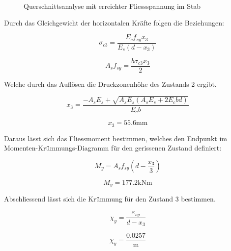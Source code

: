 \documentclass[
  12pt,
  letterpaper,
  egregdoesnotlikesansseriftitles]{scrreprt}
\begin{document}
\begin{figure}[H]


\caption{\label{fig-qs4}Querschnittsanalyse mit erreichter
Fliessspannung im Stab}

\end{figure}%

Durch das Gleichgewicht der horizontalen Kräfte folgen die Beziehungen:

\begin{equation}\sigma_{c 3} = \frac{E_{c} f_{sy} x_{3}}{E_{s} \left(d - x_{3}\right)}\end{equation}

\begin{equation}A_{s} f_{sy} = \frac{b \sigma_{c 3} x_{3}}{2}\end{equation}

Welche durch das Auflösen die Druckzonenhöhe des Zustands 2 ergibt.

\begin{equation}x_{3} = \frac{- A_{s} E_{s} + \sqrt{A_{s} E_{s} \left(A_{s} E_{s} + 2 E_{c} b d\right)}}{E_{c} b}\end{equation}

\begin{equation}x_{3} = 55.6 \text{mm}\end{equation}

Daraus lässt sich das Fliessmoment bestimmen, welches den Endpunkt im
Momenten-Krümmungs-Diagramm für den gerissenen Zustand definiert:

\begin{equation}M_{y} = A_{s} f_{sy} \left(d - \frac{x_{3}}{3}\right)\end{equation}

\begin{equation}M_{y} = 177.2 \text{kN} \text{m}\end{equation}

Abschliessend lässt sich die Krümmung für den Zustand 3 bestimmen.

\begin{equation}\chi_{y} = \frac{\varepsilon_{sy}}{d - x_{3}}\end{equation}

\begin{equation}\chi_{y} = \frac{0.0257}{\text{m}}\end{equation}
\end{document}
